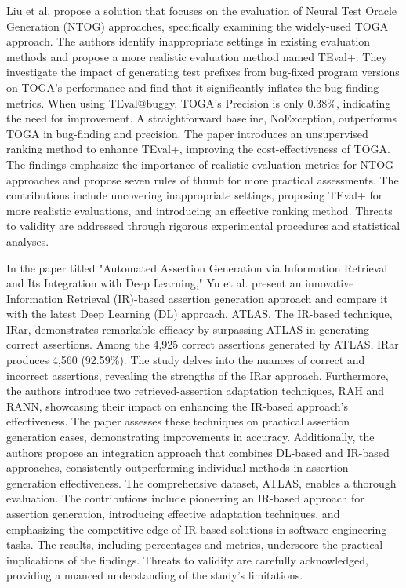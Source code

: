 Liu et al. propose a solution that focuses on the evaluation of Neural Test Oracle Generation (NTOG)\cite{liu_towards_2023} approaches, specifically examining the widely-used TOGA approach. The authors identify inappropriate settings in existing evaluation methods and propose a more realistic evaluation method named TEval+. They investigate the impact of generating test prefixes from bug-fixed program versions on TOGA's performance and find that it significantly inflates the bug-finding metrics. When using TEval@buggy, TOGA's Precision is only 0.38\%, indicating the need for improvement. A straightforward baseline, NoException, outperforms TOGA in bug-finding and precision. The paper introduces an unsupervised ranking method to enhance TEval+, improving the cost-effectiveness of TOGA. The findings emphasize the importance of realistic evaluation metrics for NTOG approaches and propose seven rules of thumb for more practical assessments. The contributions include uncovering inappropriate settings, proposing TEval+ for more realistic evaluations, and introducing an effective ranking method. Threats to validity are addressed through rigorous experimental procedures and statistical analyses.

In the paper titled "Automated Assertion Generation via Information Retrieval and Its Integration with Deep Learning," Yu et al. present an innovative Information Retrieval (IR)-based assertion generation approach\cite{yu_automated_2022} and compare it with the latest Deep Learning (DL) approach, ATLAS. The IR-based technique, IRar, demonstrates remarkable efficacy by surpassing ATLAS in generating correct assertions. Among the 4,925 correct assertions generated by ATLAS, IRar produces 4,560 (92.59\%). The study delves into the nuances of correct and incorrect assertions, revealing the strengths of the IRar approach. Furthermore, the authors introduce two retrieved-assertion adaptation techniques, RAH and RANN, showcasing their impact on enhancing the IR-based approach's effectiveness. The paper assesses these techniques on practical assertion generation cases, demonstrating improvements in accuracy. Additionally, the authors propose an integration approach that combines DL-based and IR-based approaches, consistently outperforming individual methods in assertion generation effectiveness. The comprehensive dataset, ATLAS, enables a thorough evaluation. The contributions include pioneering an IR-based approach for assertion generation, introducing effective adaptation techniques, and emphasizing the competitive edge of IR-based solutions in software engineering tasks. The results, including percentages and metrics, underscore the practical implications of the findings. Threats to validity are carefully acknowledged, providing a nuanced understanding of the study's limitations.


